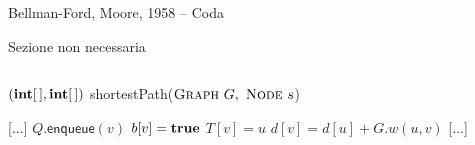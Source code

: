 \begin{frame}{Bellman-Ford, Moore, 1958 -- Coda}

\vspace{-9pt}
\begin{myboxtitle}
\BI
\item Sezione non necessaria
\EI
\end{myboxtitle}

\vspace{-18pt}
\begin{columns}
\small
\begin{Procedure}
\caption[A]{$(\INTARRAY, \INTARRAY)$ \textsf{shortestPath}($\textsc{Graph}\ G,\ \textsc{Node}\ s$)}
[...]\;
    {
      {
        $Q.\textsf{enqueue}(v)$\;
        $b[v] = \TRUE$\;
      }
      $T[v] = u$\;
      $d[v] = d[u] + G.w(u,v)$\;
    }
[...]\;
\end{Procedure}
\end{columns}

\end{frame}



